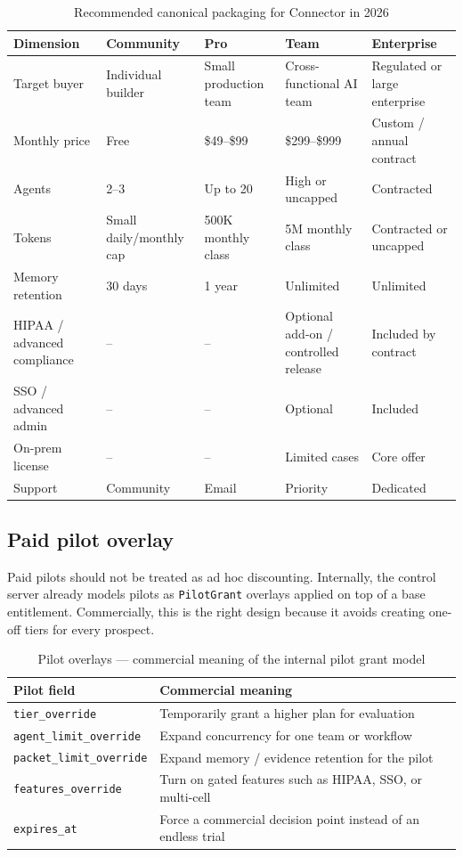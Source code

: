 \begin{table}[H]
\centering
\renewcommand{\arraystretch}{1.5}
\begin{tabularx}{\textwidth}{@{}lXXXX@{}}
\toprule
\textbf{Dimension} & \textbf{Community} & \textbf{Pro} & \textbf{Team} & \textbf{Enterprise} \\
\midrule
Target buyer & Individual builder & Small production team & Cross-functional AI team & Regulated or large enterprise \\
Monthly price & Free & \$49--\$99 & \$299--\$999 & Custom / annual contract \\
Agents & 2--3 & Up to 20 & High or uncapped & Contracted \\
Tokens & Small daily/monthly cap & 500K monthly class & 5M monthly class & Contracted or uncapped \\
Memory retention & 30 days & 1 year & Unlimited & Unlimited \\
HIPAA / advanced compliance & -- & -- & Optional add-on / controlled release & Included by contract \\
SSO / advanced admin & -- & -- & Optional & Included \\
On-prem license & -- & -- & Limited cases & Core offer \\
Support & Community & Email & Priority & Dedicated \\
\bottomrule
\end{tabularx}
\caption{Recommended canonical packaging for Connector in 2026}
\end{table}

\subsection{Paid pilot overlay}

Paid pilots should not be treated as ad hoc discounting. Internally, the
control server already models pilots as \texttt{PilotGrant} overlays applied on
top of a base entitlement. Commercially, this is the right design because it
avoids creating one-off tiers for every prospect.

\begin{table}[H]
\centering
\renewcommand{\arraystretch}{1.45}
\begin{tabularx}{\textwidth}{@{}lX@{}}
\toprule
\textbf{Pilot field} & \textbf{Commercial meaning} \\
\midrule
\texttt{tier\_override} & Temporarily grant a higher plan for evaluation \\
\texttt{agent\_limit\_override} & Expand concurrency for one team or workflow \\
\texttt{packet\_limit\_override} & Expand memory / evidence retention for the pilot \\
\texttt{features\_override} & Turn on gated features such as HIPAA, SSO, or multi-cell \\
\texttt{expires\_at} & Force a commercial decision point instead of an endless trial \\
\bottomrule
\end{tabularx}
\caption{Pilot overlays — commercial meaning of the internal pilot grant model}
\end{table}

